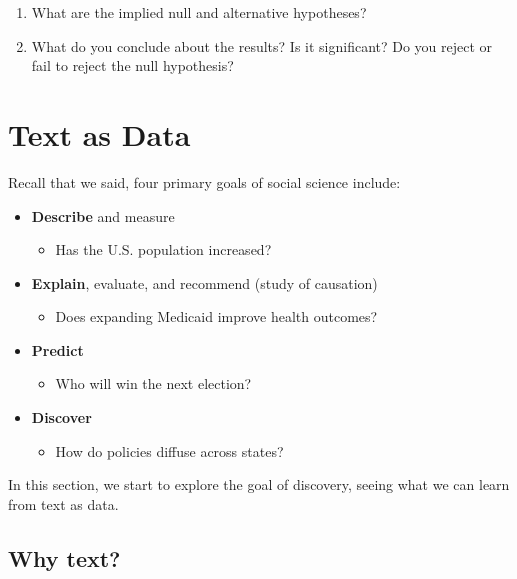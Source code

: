 \documentclass[
  letterpaper,
  DIV=11,
  numbers=noendperiod]{scrreprt}
\providecommand{\tightlist}{%
  \setlength{\itemsep}{0pt}\setlength{\parskip}{0pt}}\usepackage{longtable,booktabs,array}
\begin{document}
\begin{enumerate}
\def\labelenumi{\arabic{enumi}.}
\tightlist
\item
  What are the implied null and alternative hypotheses?
\item
  What do you conclude about the results? Is it significant? Do you
  reject or fail to reject the null hypothesis?
\end{enumerate}


\hypertarget{text}{%
\chapter{Text as Data}\label{text}}

Recall that we said, four primary goals of social science include:

\begin{itemize}
\tightlist
\item
  \textbf{Describe} and measure

  \begin{itemize}
  \tightlist
  \item
    Has the U.S. population increased?
  \end{itemize}
\item
  \textbf{Explain}, evaluate, and recommend (study of causation)

  \begin{itemize}
  \tightlist
  \item
    Does expanding Medicaid improve health outcomes?
  \end{itemize}
\item
  \textbf{Predict}

  \begin{itemize}
  \tightlist
  \item
    Who will win the next election?
  \end{itemize}
\item
  \textbf{Discover}

  \begin{itemize}
  \tightlist
  \item
    How do policies diffuse across states?
  \end{itemize}
\end{itemize}

In this section, we start to explore the goal of discovery, seeing what
we can learn from text as data.

\hypertarget{why-text}{%
\section{Why text?}\label{why-text}}
\end{document}
